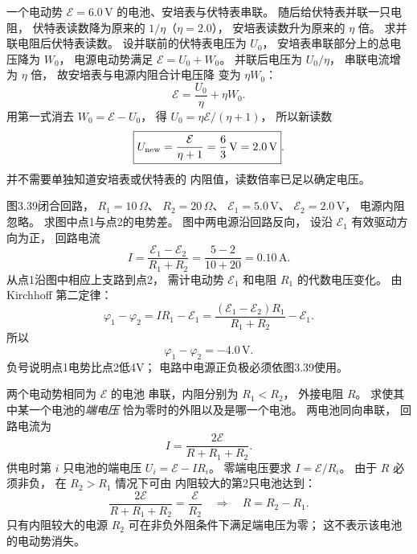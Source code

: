 一个电动势 $\mathcal E=6.0\,\mathrm V$
的电池、安培表与伏特表串联。
随后给伏特表并联一只电阻，
伏特表读数降为原来的
$1/\eta$（$\eta=2.0$），
安培表读数升为原来的 $\eta$ 倍。
求并联电阻后伏特表读数。
\exsolution
设并联前的伏特表电压为 $U_0$，
安培表串联部分上的总电压降为 $W_0$，
电源电动势满足
$\mathcal E=U_0+W_0$。
并联后电压为 $U_0/\eta$，
串联电流增为 $\eta$ 倍，
故安培表与电源内阻合计电压降
变为 $\eta W_0$：
\[
\mathcal E=\frac{U_0}{\eta}+\eta W_0.
\]
用第一式消去 $W_0=\mathcal E-U_0$，
得
$U_0=\eta\mathcal E/(\eta+1)$，
所以新读数
\[
\boxed{U_{\rm new}=\frac{\mathcal E}{\eta+1}
=\frac6{3}\,\mathrm V=2.0\,\mathrm V}.
\]
\excheck 并不需要单独知道安培表或伏特表的
内阻值，读数倍率已足以确定电压。

图3.39闭合回路，
$R_1=10\,\Omega$、
$R_2=20\,\Omega$、
$\mathcal E_1=5.0\,\mathrm V$、
$\mathcal E_2=2.0\,\mathrm V$，
电源内阻忽略。
求图中点1与点2的电势差。
\exsolution
图中两电源沿回路反向，
设沿 $\mathcal E_1$ 有效驱动方向为正，
回路电流
\[
I=\frac{\mathcal E_1-\mathcal E_2}{R_1+R_2}
=\frac{5-2}{10+20}=0.10\,\mathrm A.
\]
从点1沿图中相应上支路到点2，
需计电动势 $\mathcal E_1$
和电阻 $R_1$ 的代数电压变化。
由 Kirchhoff 第二定律：
\[
\varphi_1-\varphi_2
=IR_1-\mathcal E_1
=\frac{(\mathcal E_1-\mathcal E_2)R_1}
{R_1+R_2}-\mathcal E_1.
\]
所以
\[
\boxed{\varphi_1-\varphi_2=-4.0\,\mathrm V}.
\]
\excheck 负号说明点1电势比点2低4V；
电路中电源正负极必须依图3.39使用。

两个电动势相同为 $\mathcal E$ 的电池
串联，内阻分别为 $R_1<R_2$，
外接电阻 $R$。
求使其中某一个电池的\emph{端电压}
恰为零时的外阻以及是哪一个电池。
\exsolution
两电池同向串联，
回路电流为
\[
I=\frac{2\mathcal E}{R+R_1+R_2}.
\]
供电时第 $i$ 只电池的端电压
$U_i=\mathcal E-IR_i$。
零端电压要求
$I=\mathcal E/R_i$。
由于 $R$ 必须非负，
在 $R_2>R_1$ 情况下可由
内阻较大的第2只电池达到：
\[
\frac{2\mathcal E}{R+R_1+R_2}
=\frac{\mathcal E}{R_2}
\quad\Longrightarrow\quad
\boxed{R=R_2-R_1}.
\]
\excheck 只有内阻较大的电源
$R_2$ 可在非负外阻条件下满足端电压为零；
这不表示该电池的电动势消失。
